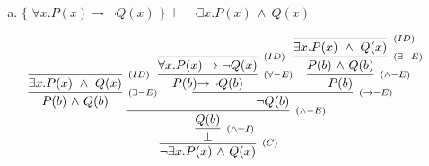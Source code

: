 \documentclass[aspectratio=43]{beamer}
\newcommand{\ria}{$\rightarrow$}
\newcommand{\ex}{$\exists$}
\newcommand{\nao}{$\neg$}
\newcommand{\nex}{\nao\ex}
\newcommand{\andd}{$\wedge$}
\begin{document}
	\begin{frame}[fragile]
    
    	\begin{enumerate}[b)]
			
			\item $\{$ $\forall x.P(x)\to \neg Q(x)$ $\}$ $\vdash$ $ \neg\exists  x.P(x)\ \wedge\ Q(x)$ \\ 
			
		\end{enumerate}
        \vspace{50pt}
		\[
        \begin{array}{c}
		\infer[_{(C)}]
			{$\nex$ x.P(x)\ $\andd$\ Q(x)}
			{\infer[_{(\land-I)}] 
            	{\bot}
                {\infer[_{(\land-E)}] 
                	{Q(b)}
                    {\infer[_{(\exists-E)}]
                    	{P(b)\ $\andd$\ Q(b)}
                        {\infer[_{(ID)}] 
                			{\exists x.P(x)\ \wedge\ Q(x)}
                    		{}
                    	}
                	\infer[_{(\to-E)}] 
                		{$\nao$ Q(b)}
                		{\infer[_{(\forall-E)}] 
                    		{P(b) $\ria$ $\nao$ Q(b)}
                    		{\infer[_{(ID)}]
                				{\forall x.P(x)\to \neg Q(x)}
                    			{}
                			}
                    	\infer[_{(\land-E)}] 
                    		{P(b)}
                        	{\infer[_{(\exists-E)}] 
                        		{P(b)\ $\andd$\ Q(b)}
                        		{\infer[_{(ID)}]
                            		{\exists x.P(x)\ \wedge\ Q(x)}
                            		{}
                            	}
                        	}
                    	}
                	}
            	}
            }
		\end{array}
        \]
		
	\end{frame}
	
\end{document}

